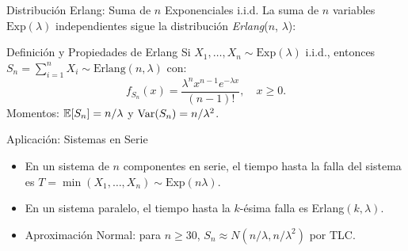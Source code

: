 \documentclass[10pt, aspectratio=169]{beamer}
\begin{document}
\begin{frame}{Distribución Erlang: Suma de $n$ Exponenciales i.i.d.}
  \footnotesize
  La suma de $n$ variables $\text{Exp}(\lambda)$ independientes sigue la distribución \emph{Erlang}($n$, $\lambda$): \pause

  \vspace{0.1cm}
  \begin{block}{Definición y Propiedades de Erlang}
    Si $X_{1}, \dots, X_{n} \sim \text{Exp}(\lambda)$ i.i.d., entonces $S_{n} = \sum_{i=1}^{n} X_{i} \sim \text{Erlang}(n, \lambda)$ con:
    $$f_{S_{n}}(x) = \dfrac{\lambda^{n} x^{n-1} e^{-\lambda x}}{(n-1)!}, \quad x \ge 0.$$
    Momentos: $\mathbb{E}[S_{n}] = n/\lambda$ y $\operatorname{Var}(S_{n}) = n/\lambda^{2}$.
  \end{block}

  \vspace{0.1cm}
  \pause
  \begin{alertblock}{Aplicación: Sistemas en Serie}
    \begin{itemize}\itemsep=0.05cm
      \item En un sistema de $n$ componentes en serie, el tiempo hasta la falla del sistema es $T = \min(X_{1}, \dots, X_{n}) \sim \text{Exp}(n\lambda)$.
      \item En un sistema paralelo, el tiempo hasta la $k$-ésima falla es Erlang$(k, \lambda)$.
      \item Aproximación Normal: para $n \ge 30$, $S_{n} \approx N(n/\lambda, n/\lambda^{2})$ por TLC.
    \end{itemize}
  \end{alertblock}
\end{frame}
\end{document}
